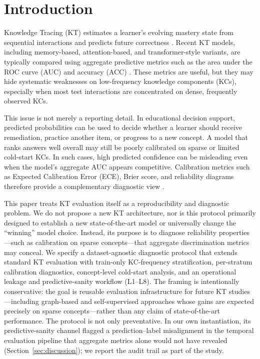 \section{Introduction}
\label{sec:introduction}
Knowledge Tracing (KT) estimates a learner's evolving mastery state from sequential interactions and predicts future correctness \citep{corbett1994knowledge,piech2015deep,abdelrahman2023knowledge}. Recent KT models, including memory-based, attention-based, and transformer-style variants, are typically compared using aggregate predictive metrics such as the area under the ROC curve (AUC) and accuracy (ACC) \citep{zhang2017dynamic,ghosh2020context,liu2023simplekt}. These metrics are useful, but they may hide systematic weaknesses on low-frequency knowledge components (KCs), especially when most test interactions are concentrated on dense, frequently observed KCs.

This issue is not merely a reporting detail. In educational decision support, predicted probabilities can be used to decide whether a learner should receive remediation, practice another item, or progress to a new concept. A model that ranks answers well overall may still be poorly calibrated on sparse or limited cold-start KCs. In such cases, high predicted confidence can be misleading even when the model's aggregate AUC appears competitive. Calibration metrics such as Expected Calibration Error (ECE), Brier score, and reliability diagrams therefore provide a complementary diagnostic view \citep{guo2017calibration,brier1950verification,degroot1983comparison}.

This paper treats KT evaluation itself as a reproducibility and diagnostic problem. We do not propose a new KT architecture, nor is this protocol primarily designed to establish a new state-of-the-art model or universally change the ``winning'' model choice. Instead, its purpose is to diagnose reliability properties---such as calibration on sparse concepts---that aggregate discrimination metrics may conceal. We specify a dataset-agnostic diagnostic protocol that extends standard KT evaluation with train-only KC-frequency stratification, per-stratum calibration diagnostics, concept-level cold-start analysis, and an operational leakage and predictive-sanity workflow (L1--L8). The framing is intentionally conservative: the goal is reusable evaluation infrastructure for future KT studies---including graph-based and self-supervised approaches whose gains are expected precisely on sparse concepts---rather than any claim of state-of-the-art performance. The protocol is not only preventative. In our own instantiation, its predictive-sanity channel flagged a prediction--label misalignment in the temporal evaluation pipeline that aggregate metrics alone would not have revealed (Section~\ref{sec:discussion}); we report the audit trail as part of the study.


